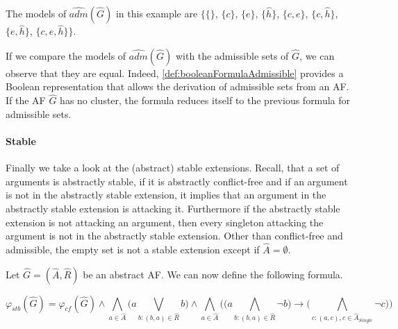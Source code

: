 \begin{example}
The models of $ \hat{adm}(\hat{G})$ in this example are $\big\{\{\}$, $\{c\}$, $\{e\}$, $\{\hat{h}\}$, $\{c, e\}$, $\{c, \hat{h}\}$, $\{e, \hat{h}\}$, $\{c, e, \hat{h}\} \big\}$.
\end{example}

If we compare the models of $ \hat{adm}(\hat{G})$ with the admissible sets of $\hat{G}$, we can observe that they are equal. Indeed, \cref{def:booleanFormulaAdmissible} provides a Boolean representation that allows the derivation of admissible sets from an AF. If the AF $\hat{G}$ has no cluster, the formula reduces itself to the previous formula for admissible sets.



\paragraph{Stable} Finally we take a look at the (abstract) stable extensions. Recall, that a set of arguments is abstractly stable, if it is abstractly conflict-free and if an
argument is not in the abstractly stable extension, it implies that an argument in the
abstractly stable extension is attacking it. Furthermore if the abstractly stable extension
is not attacking an argument, then every singleton attacking the argument is not in the
abstractly stable extension. Other than conflict-free and admissible, the empty set is not a stable extension except if $\hat{A} = \emptyset$.

\begin{definition}
    Let $\hat{G}=(\hat{A},\hat{R})$ be an abstract AF. We can now define the following formula.
    \begin{center}
        \[ \varphi_{stb}(\hat{G}) =
        \varphi_{cf}(\hat{G}) \land \bigwedge_{a \in \hat{A}} \big( a \bigvee_{b:(b,a)\in \hat{R}} b\big) \land \bigwedge_{a \in \hat{A}} \big( \big(  a \bigwedge_{b:(b,a) \in \hat{R}} \lnot b\big)  \rightarrow \big( \bigwedge_{c:(a,c), c \in \hat{A}_{\mathit{Single}}} \lnot c\big) \big)
        \]
    \end{center}
    \label{def:booleanFormulaStable}
\end{definition}


